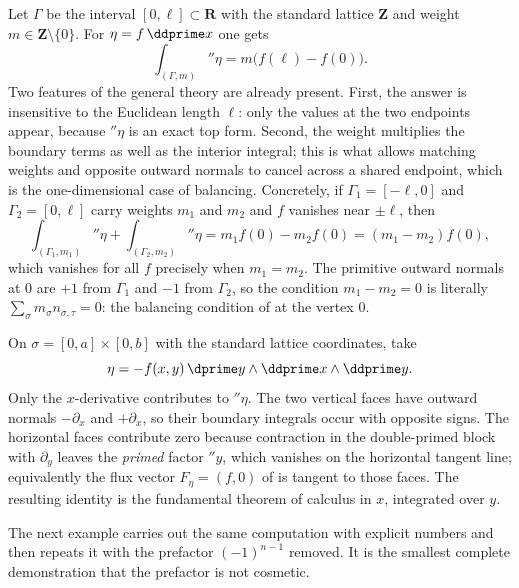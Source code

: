 \begin{example}
\label{ex:ch11-weighted-segment}
Let $\Gamma$ be the interval $[0,\ell]\subset\mathbf R$ with the standard
lattice $\mathbf Z$ and weight $m\in\mathbf Z\setminus\{0\}$.  For
$\eta=f\,\ddprime x$ one gets
\[
 \int_{(\Gamma,m)}\dprime\eta=m\bigl(f(\ell)-f(0)\bigr).
\]
Two features of the general theory are already present.  First, the answer is
insensitive to the Euclidean length $\ell$: only the values at the two
endpoints appear, because $\dprime\eta$ is an exact top form.  Second, the
weight multiplies the boundary terms as well as the interior integral;
this is what allows matching weights and opposite outward normals to
cancel across a shared
endpoint, which is the one-dimensional case of balancing.  Concretely, if
$\Gamma_1=[-\ell,0]$ and $\Gamma_2=[0,\ell]$ carry weights $m_1$ and $m_2$
and $f$ vanishes near $\pm\ell$, then
\[
 \int_{(\Gamma_1,m_1)}\dprime\eta+\int_{(\Gamma_2,m_2)}\dprime\eta
 =m_1f(0)-m_2f(0)=(m_1-m_2)f(0),
\]
which vanishes for all $f$ precisely when $m_1=m_2$.  The primitive outward
normals at $0$ are $+1$ from $\Gamma_1$ and $-1$ from $\Gamma_2$, so the
condition $m_1-m_2=0$ is literally $\sum_\sigma m_\sigma n_{\sigma,\tau}=0$:
the balancing condition of  at the vertex $0$.
\end{example}

\begin{example}
\label{ex:ch11-rectangle-boundary}
On $\sigma=[0,a]\times[0,b]$ with the standard lattice coordinates, take
\[
 \eta=-f(x,y)\,\dprime y\wedge\ddprime x\wedge\ddprime y.
\]
Only the $x$-derivative contributes to
$\dprime\eta$.  The two vertical faces have outward normals
$-\partial_x$ and $+\partial_x$, so their boundary integrals occur with
opposite signs.  The horizontal faces contribute zero because contraction
in the double-primed block with $\partial_y$ leaves the \emph{primed} factor
$\dprime y$, which vanishes on the horizontal tangent line; equivalently the
flux vector $F_\eta=(f,0)$ of  is tangent to those
faces.  The resulting
identity is the fundamental theorem of calculus in $x$, integrated over
$y$.
\end{example}

The next example carries out the same computation with explicit numbers and
then repeats it with the prefactor $(-1)^{n-1}$ removed.  It is the smallest
complete demonstration that the prefactor is not cosmetic.

